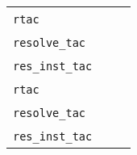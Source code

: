 \begin{isabellebody}
\begin{isamarkuptext}
  \medskip
  \begin{tabular}{lll}
    \verb|rtac|~\isa{{\isachardoublequote}a\ {\isadigit{1}}{\isachardoublequote}} & & \isa{{\isachardoublequote}rule\ a{\isachardoublequote}} \\
    \verb|resolve_tac|~\isa{{\isachardoublequote}{\isacharbrackleft}a\isactrlsub {\isadigit{1}}{\isacharcomma}\ {\isasymdots}{\isacharbrackright}\ {\isadigit{1}}{\isachardoublequote}} & & \isa{{\isachardoublequote}rule\ a\isactrlsub {\isadigit{1}}\ {\isasymdots}{\isachardoublequote}} \\
    \verb|res_inst_tac|~\isa{{\isachardoublequote}{\isacharbrackleft}{\isacharparenleft}x\isactrlsub {\isadigit{1}}{\isacharcomma}\ t\isactrlsub {\isadigit{1}}{\isacharparenright}{\isacharcomma}\ {\isasymdots}{\isacharbrackright}\ a\ {\isadigit{1}}{\isachardoublequote}} & &
    \isa{{\isachardoublequote}rule{\isacharunderscore}tac\ x\isactrlsub {\isadigit{1}}\ {\isacharequal}\ t\isactrlsub {\isadigit{1}}\ {\isasymAND}\ {\isasymdots}\ {\isasymIN}\ a{\isachardoublequote}} \\[0.5ex]
    \verb|rtac|~\isa{{\isachardoublequote}a\ i{\isachardoublequote}} & & \isa{{\isachardoublequote}rule{\isacharunderscore}tac\ {\isacharbrackleft}i{\isacharbrackright}\ a{\isachardoublequote}} \\
    \verb|resolve_tac|~\isa{{\isachardoublequote}{\isacharbrackleft}a\isactrlsub {\isadigit{1}}{\isacharcomma}\ {\isasymdots}{\isacharbrackright}\ i{\isachardoublequote}} & & \isa{{\isachardoublequote}rule{\isacharunderscore}tac\ {\isacharbrackleft}i{\isacharbrackright}\ a\isactrlsub {\isadigit{1}}\ {\isasymdots}{\isachardoublequote}} \\
    \verb|res_inst_tac|~\isa{{\isachardoublequote}{\isacharbrackleft}{\isacharparenleft}x\isactrlsub {\isadigit{1}}{\isacharcomma}\ t\isactrlsub {\isadigit{1}}{\isacharparenright}{\isacharcomma}\ {\isasymdots}{\isacharbrackright}\ a\ i{\isachardoublequote}} & &
    \isa{{\isachardoublequote}rule{\isacharunderscore}tac\ {\isacharbrackleft}i{\isacharbrackright}\ x\isactrlsub {\isadigit{1}}\ {\isacharequal}\ t\isactrlsub {\isadigit{1}}\ {\isasymAND}\ {\isasymdots}\ {\isasymIN}\ a{\isachardoublequote}} \\
  \end{tabular}
  \medskip


\end{isamarkuptext}
\end{isabellebody}

